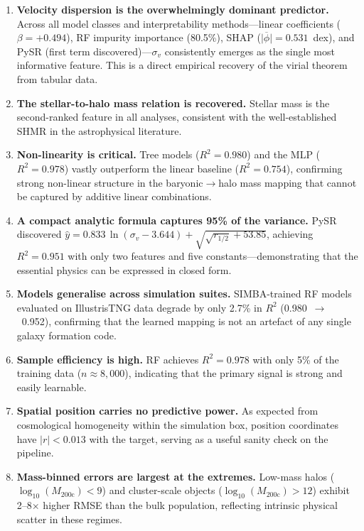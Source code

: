 \documentclass[12pt, a4paper]{article}
\newcommand{\logMhalo}{\log_{10}(M_{200\mathrm{c}})}
\newcommand{\sigmav}{\sigma_v}
\begin{document}
\begin{enumerate}[nosep]
  \item \textbf{Velocity dispersion is the overwhelmingly dominant predictor.}  Across all model classes and interpretability methods---linear coefficients ($\beta = +0.494$), RF impurity importance (80.5\%), SHAP ($\overline{|\phi|} = 0.531$~dex), and PySR (first term discovered)---$\sigmav$ consistently emerges as the single most informative feature.  This is a direct empirical recovery of the virial theorem from tabular data.
  
  \item \textbf{The stellar-to-halo mass relation is recovered.}  Stellar mass is the second-ranked feature in all analyses, consistent with the well-established SHMR in the astrophysical literature.
  
  \item \textbf{Non-linearity is critical.}  Tree models ($R^2 = 0.980$) and the MLP ($R^2 = 0.978$) vastly outperform the linear baseline ($R^2 = 0.754$), confirming strong non-linear structure in the baryonic$\rightarrow$halo mass mapping that cannot be captured by additive linear combinations.
  
  \item \textbf{A compact analytic formula captures 95\% of the variance.}  PySR discovered $\hat{y} = 0.833\,\ln(\sigmav - 3.644) + \sqrt{\sqrt{r_{1/2}} + 53.85}$, achieving $R^2 = 0.951$ with only two features and five constants---demonstrating that the essential physics can be expressed in closed form.
  
  \item \textbf{Models generalise across simulation suites.}  SIMBA-trained RF models evaluated on IllustrisTNG data degrade by only 2.7\% in $R^2$ (0.980~$\rightarrow$~0.952), confirming that the learned mapping is not an artefact of any single galaxy formation code.
  
  \item \textbf{Sample efficiency is high.}  RF achieves $R^2 = 0.978$ with only 5\% of the training data ($n \approx 8{,}000$), indicating that the primary signal is strong and easily learnable.
  
  \item \textbf{Spatial position carries no predictive power.}  As expected from cosmological homogeneity within the simulation box, position coordinates have $|r| < 0.013$ with the target, serving as a useful sanity check on the pipeline.
  
  \item \textbf{Mass-binned errors are largest at the extremes.}  Low-mass halos ($\logMhalo < 9$) and cluster-scale objects ($\logMhalo > 12$) exhibit 2--8$\times$ higher RMSE than the bulk population, reflecting intrinsic physical scatter in these regimes.
\end{enumerate}
\end{document}

